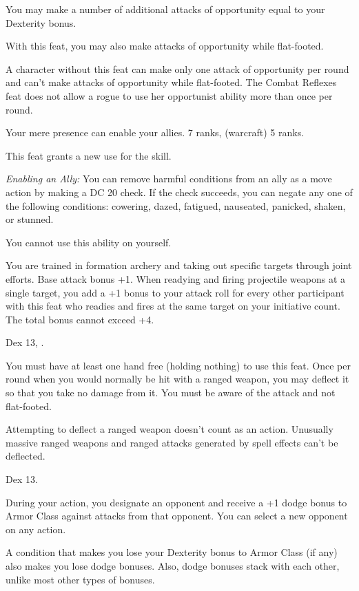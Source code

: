 {}
{You may make a number of additional attacks of opportunity equal to your Dexterity bonus.

With this feat, you may also make attacks of opportunity while flat-footed.}
{A character without this feat can make only one attack of opportunity per round and can't make attacks of opportunity while flat-footed.}
{The Combat Reflexes feat does not allow a rogue to use her opportunist ability more than once per round.}{}

{Your mere presence can enable your allies.}
{ 7 ranks,  (warcraft) 5 ranks.}
{This feat grants a new use for the  skill.

\textit{Enabling an Ally:} You can remove harmful conditions from an ally as a move action by making a DC 20  check. If the check succeeds, you can negate any one of the following conditions: cowering, dazed, fatigued, nauseated, panicked, shaken, or stunned.

You cannot use this ability on yourself.}{}{}

{You are trained in formation archery and taking out specific targets through joint efforts.}
{Base attack bonus +1.}
{When readying and firing projectile weapons at a single target, you add a +1 bonus to your attack roll for every other participant with this feat who readies and fires at the same target on your initiative count. The total bonus cannot exceed +4.}{}{}

{Dex 13, .}
{You must have at least one hand free (holding nothing) to use this feat. Once per round when you would normally be hit with a ranged weapon, you may deflect it so that you take no damage from it. You must be aware of the attack and not flat-footed.

Attempting to deflect a ranged weapon doesn't count as an action. Unusually massive ranged weapons and ranged attacks generated by spell effects can't be deflected.}

{Dex 13.}
{During your action, you designate an opponent and receive a +1 dodge bonus to Armor Class against attacks from that opponent. You can select a new opponent on any action.

A condition that makes you lose your Dexterity bonus to Armor Class (if any) also makes you lose dodge bonuses. Also, dodge bonuses stack with each other, unlike most other types of bonuses.}

